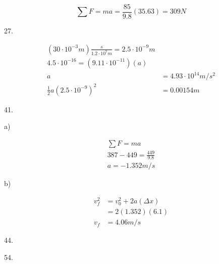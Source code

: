 \documentclass{scrreprt} %
\begin{document}
$$
\sum F = ma = \frac{85}{9.8}(35.63) = \boxed{309N}
$$

27.

\begin{align*}
	(30\cdot 10^{-3} m)\frac{s}{1.2\cdot 10^7 m} = 2.5 \cdot 10^{-9} m \\
	4.5\cdot 10^{-16} = (9.11\cdot 10^{-11})(a) \\
	a &= 4.93\cdot 10^{14} m/s^2 \\
	\frac{1}{2} a (2.5\cdot 10^{-9})^2 &= \boxed{0.00154 m}
\end{align*}

41.

a)

\begin{align*}
	\sum F = ma \\
	387 - 449 = \frac{449}{9.8} \\
	\boxed{a = -1.352 m/s}
\end{align*}

b)

\begin{align*}
	v_f^2 &= v_0^2 + 2a(\Delta x) \\
		  &= 2(1.352)(6.1) \\
	  v_f &= \boxed{4.06 m/s}
\end{align*}

44.

54.
\end{document}
